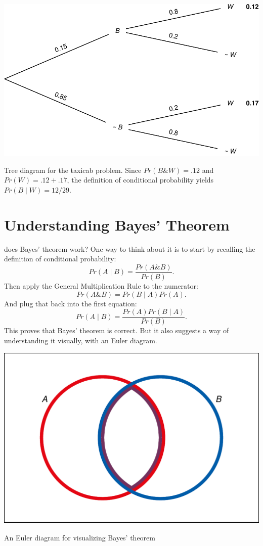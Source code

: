 \documentclass[justified]{tufte-book}
\newcommand{\given}{\mid}
\renewcommand{\wedge}{\mathbin{\&}}
\newcommand{\p}{Pr}
\theoremstyle{definition}
\theoremstyle{definition}
\theoremstyle{definition}
\theoremstyle{remark}
\begin{document}
\begin{marginfigure}
\includegraphics{_main_files/figure-latex/taxitree-1} \caption[Tree diagram for the taxicab problem]{Tree diagram for the taxicab problem. Since $\p(B \wedge W) = .12$ and $\p(W) = .12 + .17$, the definition of conditional probability yields $\p(B \given W) = 12/29$.}\label{fig:taxitree}
\end{marginfigure}

\hypertarget{understanding-bayes-theorem}{%
\section{Understanding Bayes' Theorem}\label{understanding-bayes-theorem}}

 does Bayes' theorem work? One way to think about it is to start by recalling the definition of conditional probability:
\[ \p(A \given B) = \frac{\p(A \wedge B)}{\p(B)}. \]
Then apply the General Multiplication Rule to the numerator:
\[ \p(A \wedge B) = \p(B \given A)\p(A).\]
And plug that back into the first equation:
\[ \p(A \given B) = \frac{\p(A) \p(B \given A)}{\p(B)}. \]
This proves that Bayes' theorem is correct. But it also suggests a way of understanding it visually, with an Euler diagram.

\begin{marginfigure}
\includegraphics{_main_files/figure-latex/unnamed-chunk-80-1} \caption[An Euler diagram for visualizing Bayes' theorem]{An Euler diagram for visualizing Bayes' theorem}\label{fig:unnamed-chunk-80}
\end{marginfigure}
\end{document}
